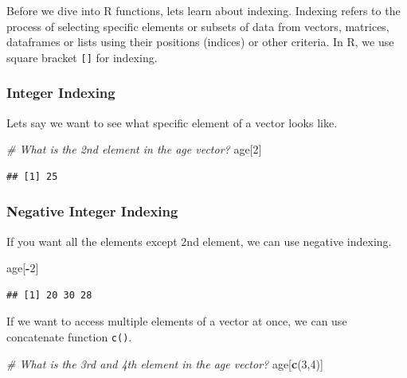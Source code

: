 \documentclass[
]{article}
\newenvironment{Shaded}{\begin{snugshade}}{\end{snugshade}}
\newcommand{\CommentTok}[1]{\textcolor[rgb]{0.56,0.35,0.01}{\textit{#1}}}
\newcommand{\DecValTok}[1]{\textcolor[rgb]{0.00,0.00,0.81}{#1}}
\newcommand{\FunctionTok}[1]{\textcolor[rgb]{0.13,0.29,0.53}{\textbf{#1}}}
\newcommand{\NormalTok}[1]{#1}
\newcommand{\SpecialCharTok}[1]{\textcolor[rgb]{0.81,0.36,0.00}{\textbf{#1}}}
\begin{document}
Before we dive into R functions, lets learn about indexing. Indexing
refers to the process of selecting specific elements or subsets of data
from vectors, matrices, dataframes or lists using their positions
(indices) or other criteria. In R, we use square bracket \texttt{{[}{]}}
for indexing.

\subsubsection{Integer Indexing}\label{integer-indexing}

Lets say we want to see what specific element of a vector looks like.

\begin{Shaded}
\begin{Highlighting}[]
\CommentTok{\# What is the 2nd element in the age vector?}
\NormalTok{age[}\DecValTok{2}\NormalTok{]}
\end{Highlighting}
\end{Shaded}

\begin{verbatim}
## [1] 25
\end{verbatim}

\subsubsection{Negative Integer
Indexing}\label{negative-integer-indexing}

If you want all the elements except 2nd element, we can use negative
indexing.

\begin{Shaded}
\begin{Highlighting}[]
\NormalTok{age[}\SpecialCharTok{{-}}\DecValTok{2}\NormalTok{]}
\end{Highlighting}
\end{Shaded}

\begin{verbatim}
## [1] 20 30 28
\end{verbatim}

If we want to access multiple elements of a vector at once, we can use
concatenate function \texttt{c()}.

\begin{Shaded}
\begin{Highlighting}[]
\CommentTok{\# What is the 3rd and 4th element in the age vector?}
\NormalTok{age[}\FunctionTok{c}\NormalTok{(}\DecValTok{3}\NormalTok{,}\DecValTok{4}\NormalTok{)]}
\end{Highlighting}
\end{Shaded}
\end{document}

